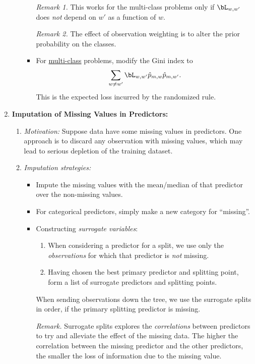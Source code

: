 \documentclass[12pt]{article}
\begin{document}
\begin{enumerate}[label=\textbf{\arabic*.}]
\begin{enumerate}
\begin{itemize}
			\textit{Remark 1.} This works for the multi-class problems only if $\bL_{w, w'}$ does \emph{not} depend on $w'$ as a function of $w$. 
			
			\textit{Remark 2.} The effect of observation weighting is to alter the prior probability on the classes. 
			
			\item For \underline{multi-class} problems, modify the Gini index to 
			\begin{align*}
				\sum_{w \neq w'} \bL_{w, w'} \hat{p}_{m, w} \hat{p}_{m, w'}. 
			\end{align*}
			This is the expected loss incurred by the randomized rule. 
		\end{itemize}
		
	\end{enumerate}
	
	\item \textbf{Imputation of Missing Values in Predictors:} 
	\begin{enumerate}
		\item \textit{Motivation:} Suppose data have some missing values in predictors. One approach is to discard any observation with missing values, which may lead to serious depletion of the training dataset. 
		\item \textit{Imputation strategies:} 
		\begin{itemize}
			\item Impute the missing values with the mean/median of that predictor over the non-missing values. 
			\item For categorical predictors, simply make a new category for ``missing''. 
			\item Constructing \textit{surrogate variables}: 
			\begin{enumerate}
				\item When considering a predictor for a split, we use only the \textit{observations} for which that predictor is \emph{not} missing. 
				\item Having chosen the best primary predictor and splitting point, form a list of surrogate predictors and splitting points. 
			\end{enumerate}
			When sending observations down the tree, we use the surrogate splits in order, if the primary splitting predictor is missing. 
			
			\textit{Remark.} Surrogate splits explores the \emph{correlations} between predictors to try and alleviate the effect of the missing data. The higher the correlation between the missing predictor and the other predictors, the smaller the loss of information due to the missing value. 
		\end{itemize}
		

\end{enumerate}
\end{enumerate}
\end{document}
